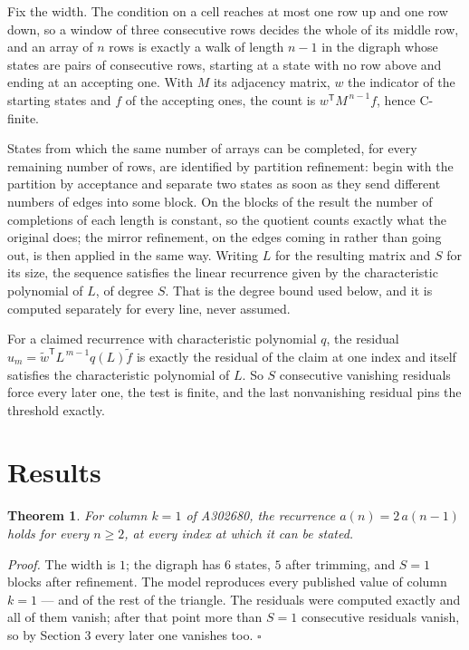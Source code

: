 \documentclass[11pt]{article}
\newtheorem{theorem}{Theorem}
\theoremstyle{definition}
\begin{document}
Fix the width. The condition on a cell reaches at most one row up and one row down, so a window of three consecutive rows decides the whole of its middle row, and an array of $n$ rows is exactly a walk of length $n-1$ in the digraph whose states are pairs of consecutive rows, starting at a state with no row above and ending at an accepting one. With $M$ its adjacency matrix, $w$ the indicator of the starting states and $f$ of the accepting ones, the count is $w^{\mathsf T}M^{\,n-1}f$, hence C-finite.

States from which the same number of arrays can be completed, for every remaining number of rows, are identified by partition refinement: begin with the partition by acceptance and separate two states as soon as they send different numbers of edges into some block. On the blocks of the result the number of completions of each length is constant, so the quotient counts exactly what the original does; the mirror refinement, on the edges coming in rather than going out, is then applied in the same way. Writing $L$ for the resulting matrix and $S$ for its size, the sequence satisfies the linear recurrence given by the characteristic polynomial of $L$, of degree $S$. That is the degree bound used below, and it is computed separately for every line, never assumed.

For a claimed recurrence with characteristic polynomial $q$, the residual $u_m = \tilde w^{\mathsf T}L^{\,m-1}q(L)\tilde f$ is exactly the residual of the claim at one index and itself satisfies the characteristic polynomial of $L$. So $S$ consecutive vanishing residuals force every later one, the test is finite, and the last nonvanishing residual pins the threshold exactly.

\section{Results}

\begin{theorem} For column $k = 1$ of A302680, the recurrence $a(n) = 2\,a(n-1)$ holds for every $n \ge 2$, at every index at which it can be stated.\end{theorem}

{\itshape Proof.} The width is $1$; the digraph has $6$ states, $5$ after trimming, and $S = 1$ blocks after refinement. The model reproduces every published value of column $k = 1$ --- and of the rest of the triangle. The residuals were computed exactly and all of them vanish; after that point more than $S = 1$ consecutive residuals vanish, so by Section 3 every later one vanishes too. $\square$
\end{document}
